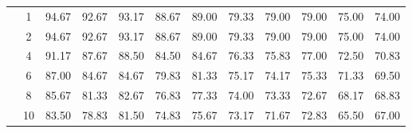 \begin{table}[H]
\begin{tabular}{|c|c|c c c c c|c c c c c|}
\multicolumn{1}{|c|}{ \multirow{6}{*}{\rotatebox[origin=c]{90}{\textbf{K-vizinhos}}} }
&1	&94.67&	92.67&	93.17&	88.67&	89.00&	79.33&	79.00&  79.00&	75.00&	74.00\\\cline{2-12}
&2	&94.67&	92.67&	93.17&	88.67&	89.00&	79.33&	79.00&	79.00&	75.00&	74.00\\\cline{2-12}
&4	&91.17&	87.67&	88.50&	84.50&	84.67&	76.33&	75.83&	77.00&	72.50&	70.83\\\cline{2-12}
&6	&87.00&	84.67&	84.67&	79.83&	81.33&	75.17&	74.17&	75.33&	71.33&	69.50\\\cline{2-12}
&8	&85.67&	81.33&	82.67&	76.83&	77.33&	74.00&	73.33&	72.67&	68.17&	68.83\\\cline{2-12}
&10	&83.50&	78.83&	81.50&	74.83&	75.67&	73.17&	71.67&	72.83&	65.50&	67.00\\\midrule
	\end{tabular}
\end{table}




